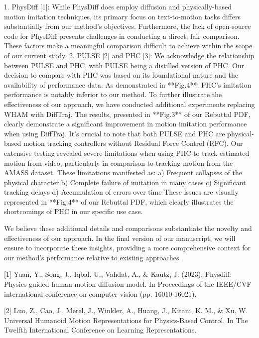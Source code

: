 1. PhysDiff [1]: 
While PhysDiff does employ diffusion and physically-based motion imitation techniques, its primary focus on text-to-motion tasks differs substantially from our method's objectives. Furthermore, the lack of open-source code for PhysDiff presents challenges in conducting a direct, fair comparison. These factors make a meaningful comparison difficult to achieve within the scope of our current study.
2. PULSE [2] and PHC [3]: 
We acknowledge the relationship between PULSE and PHC, with PULSE being a distilled version of PHC. Our decision to compare with PHC was based on its foundational nature and the availability of performance data. As demonstrated in **Fig.4**, PHC's imitation performance is notably inferior to our method.
To further illustrate the effectiveness of our approach, we have conducted additional experiments replacing WHAM with DiffTraj. The results, presented in **Fig.3** of our Rebuttal PDF, clearly demonstrate a significant improvement in motion imitation performance when using DiffTraj.
It's crucial to note that both PULSE and PHC are physical-based motion tracking controllers without Residual Force Control (RFC). Our extensive testing revealed severe limitations when using PHC to track estimated motion from video, particularly in comparison to tracking motion from the AMASS dataset. These limitations manifested as:
    a) Frequent collapses of the physical character
    b) Complete failure of imitation in many cases
    c) Significant tracking delays
    d) Accumulation of errors over time
These issues are visually represented in **Fig.4** of our Rebuttal PDF, which clearly illustrates the shortcomings of PHC in our specific use case.

We believe these additional details and comparisons substantiate the novelty and effectiveness of our approach. In the final version of our manuscript, we will ensure to incorporate these insights, providing a more comprehensive context for our method's performance relative to existing approaches.



[1] Yuan, Y., Song, J., Iqbal, U., Vahdat, A., & Kautz, J. (2023). Physdiff: Physics-guided human motion diffusion model. In Proceedings of the IEEE/CVF international conference on computer vision (pp. 16010-16021).

[2] Luo, Z., Cao, J., Merel, J., Winkler, A., Huang, J., Kitani, K. M., & Xu, W. Universal Humanoid Motion Representations for Physics-Based Control. In The Twelfth International Conference on Learning Representations.

